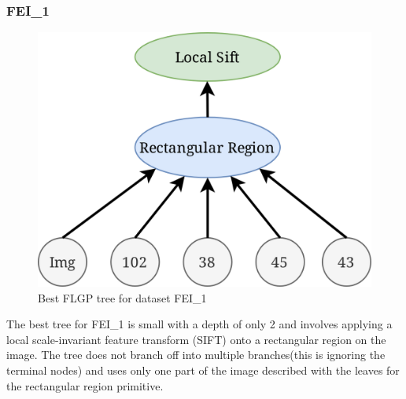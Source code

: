 \documentclass{article}
\begin{document}
\subsubsection*{FEI\_1}
\begin{figure}[h!]
	\centering
	\includegraphics[width=\linewidth]{flgp_F1.png}
	\caption{Best FLGP tree for dataset FEI\_1}
\end{figure}
\noindent The best tree for FEI\_1 is small with a depth of only 2 and involves applying a local scale-invariant feature transform (SIFT) onto a rectangular region on the image. The tree does not branch off into multiple branches(this is ignoring the terminal nodes) and uses only one part of the image described with the leaves for the rectangular region primitive.  \par
\end{document}
